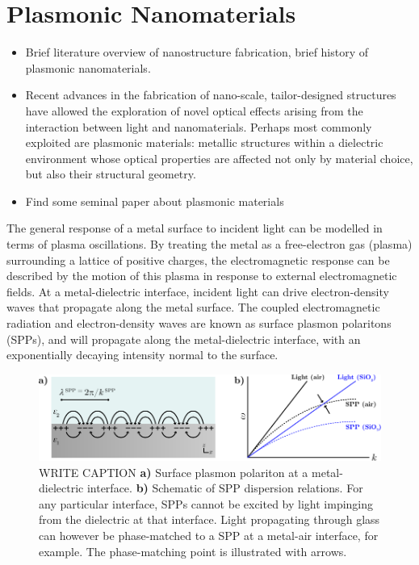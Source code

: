 \chapter{Plasmonic Nanomaterials}\label{sec:background:Plasmonics}

\begin{itemize}
    \item Brief literature overview of nanostructure fabrication, brief history of plasmonic nanomaterials.
    \item Recent advances in the fabrication of nano-scale, tailor-designed structures have allowed the exploration of novel optical effects arising from the interaction between light and nanomaterials. Perhaps most commonly exploited are plasmonic materials: metallic structures within a dielectric environment whose optical properties are affected not only by material choice, but also their structural geometry.
    \item Find some seminal paper about plasmonic materials
\end{itemize}
The general response of a metal surface to incident light can be modelled in terms of plasma oscillations. By treating the metal as a free-electron gas (plasma) surrounding a lattice of positive charges, the electromagnetic response can be described by the motion of this plasma in response to external electromagnetic fields. 
At a metal-dielectric interface, incident light can drive electron-density waves that propagate along the metal surface. The coupled electromagnetic radiation and electron-density waves are known as surface plasmon polaritons (SPPs), and will propagate along the metal-dielectric interface, with an exponentially decaying intensity normal to the surface.

\begin{figure}[htb!]
    \centering
    \includegraphics[scale=1.0]{./figures/background/plasmonics/spp.pdf}
    \caption{\label{fig:background:Plasmonics:SPP} WRITE CAPTION \textbf{a)} Surface plasmon polariton at a metal-dielectric interface. \textbf{b)} Schematic of SPP dispersion relations. For any particular interface, SPPs cannot be excited by light impinging from the dielectric at that interface. Light propagating through glass can however be phase-matched to a SPP at a metal-air interface, for example. The phase-matching point is illustrated with arrows. }
\end{figure}

